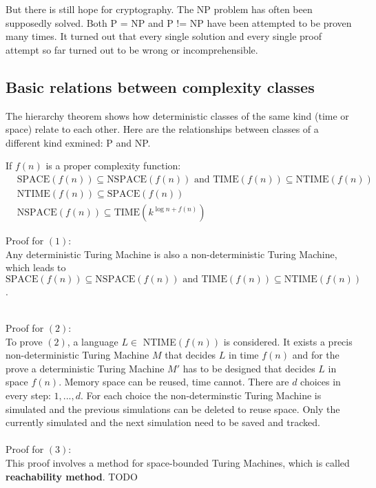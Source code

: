 \documentclass[a4]{scrartcl}
\begin{document}
But there is still hope for cryptography. The NP problem has often been supposedly solved. Both P = NP and P != NP have been attempted to be proven many times. It turned out that every single solution and every single proof attempt so far turned out to be wrong or incomprehensible. \cite{DD, book, GTI}






\subsection*{Basic relations between complexity classes}


The hierarchy theorem shows how deterministic classes of the same kind (time or space) relate to each other.
Here are the relationships between classes of a different kind exmined: P and NP.

If $f(n)$ is a proper complexity function:
\begin{align}
& \text{SPACE}(f(n)) \subseteq \text{NSPACE}(f(n)) \text{ and TIME}(f(n)) \subseteq \text{NTIME}(f(n)) \\
& \text{NTIME}(f(n)) \subseteq \text{SPACE}(f(n)) \\
& \text{NSPACE}(f(n)) \subseteq \text{TIME}(k^{\log n + f(n)}) 
\end{align}

Proof for $(1)$: \\
Any deterministic Turing Machine is also a non-deterministic Turing Machine, which leads to $\text{SPACE}(f(n)) \subseteq \text{NSPACE}(f(n)) \text{ and TIME}(f(n)) \subseteq \text{NTIME}(f(n))$.

\ \\
Proof for $(2)$: \\
To prove $(2)$, a language $L \in $ NTIME$(f(n))$ is considered. It exists a precis non-deterministic Turing Machine $M$ that decides $L$ in time $f(n)$ and for the prove a deterministic Turing Machine $M'$ has to be designed that decides $L$ in space $f(n)$.
Memory space can be reused, time cannot.
There are $d$ choices in every step: $1,...,d$. For each choice the non-determinstic Turing Machine is simulated and the previous simulations can be deleted to reuse space. Only the currently simulated and the next simulation need to be saved and tracked. \\


\ \\
Proof for $(3)$: \\
This proof involves a method for space-bounded Turing Machines, which is called \textbf{reachability method}.
\color{red} TODO \\
\color{black}
\end{document}
